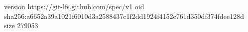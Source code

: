 version https://git-lfs.github.com/spec/v1
oid sha256:a6652a39a1021f6010d3a2588437c1f2dd1924f4152c761d350df374fdee128d
size 279053
